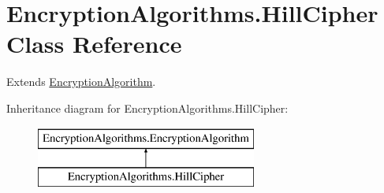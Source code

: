 \hypertarget{classEncryptionAlgorithms_1_1HillCipher}{}\section{Encryption\+Algorithms.\+Hill\+Cipher Class Reference}
\label{classEncryptionAlgorithms_1_1HillCipher}


Extends \mbox{\hyperlink{classEncryptionAlgorithms_1_1EncryptionAlgorithm}{Encryption\+Algorithm}}.  


Inheritance diagram for Encryption\+Algorithms.\+Hill\+Cipher\+:\begin{figure}[H]
\begin{center}
\leavevmode
\includegraphics[height=2.000000cm]{classEncryptionAlgorithms_1_1HillCipher}
\end{center}
\end{figure}
